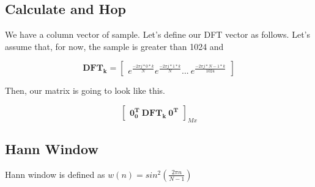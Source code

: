 \documentclass{article}
\newcommand{\matr}[1]{\mathbf{#1}}
\begin{document}
	\subsection{Calculate and Hop}
		We have a column vector of sample. Let's define our DFT vector as follows.
		Let's assume that, for now, the sample is greater than 1024 and 

		\begin{equation*}
		\matr{DFT_{k}} = 		
		\begin{bmatrix}	
		e^{\frac{-2 \pi j*0*k}{N}} e^{\frac{-2 \pi j*1*k}{N}} ... \ e^{\frac{-2 \pi j*N-1*k}{1024}}
		\end{bmatrix}	
		\end{equation*}	

		Then, our matrix is going to look like this.
	
		\begin{equation*}
		\begin{bmatrix} 
		\matr{0^{T}_{0}} \ \matr{DFT_{k}} \ \matr{0^{T}_{}}
		
		\end{bmatrix}_{M x}
		\end{equation*}	
		
	\subsection{Hann Window}
		Hann window is defined as $w(n) = sin^{2}(\frac{2 \pi n}{N - 1})$
		

	
				
		
\end{document}
